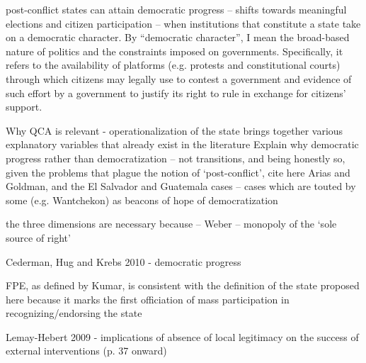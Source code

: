 \documentclass [11pt]{article}
\begin{document}
post-conflict states can attain democratic progress -- shifts towards meaningful elections and citizen participation -- when institutions that constitute a state take on a democratic character. By ``democratic character'', I mean the broad-based nature of politics and the constraints imposed on governments. Specifically, it refers to the availability of platforms (e.g. protests and constitutional courts) through which citizens may legally use to contest a government and evidence of such effort by a government to justify its right to rule in exchange for citizens' support.

Why QCA is relevant - operationalization of the state brings together various explanatory variables that already exist in the literature
Explain why democratic progress rather than democratization -- not transitions, and being honestly so, given the problems that plague the notion of `post-conflict', cite here Arias and Goldman, and the El Salvador and Guatemala cases -- cases which are touted by some (e.g. Wantchekon) as beacons of hope of democratization

the three dimensions are necessary because -- Weber -- monopoly of the `sole source of right'


Cederman, Hug and Krebs 2010 - democratic progress

FPE, as defined by Kumar, is consistent with the definition of the state proposed here because it marks the first officiation of mass participation in recognizing/endorsing the state

Lemay-Hebert 2009 - implications of absence of local legitimacy on the success of external interventions (p. 37 onward)








\end{document}
